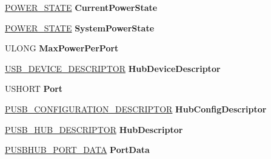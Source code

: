 \begin{DoxyCompactItemize}
\hyperlink{union___p_o_w_e_r___s_t_a_t_e}{P\+O\+W\+E\+R\+\_\+\+S\+T\+A\+TE} {\bfseries Current\+Power\+State}
\item 
\mbox{\label{struct___u_s_b_h_u_b___f_d_o___e_x_t_e_n_s_i_o_n_af9855319a7eea1134937a17fe565c3e7}} 
\hyperlink{union___p_o_w_e_r___s_t_a_t_e}{P\+O\+W\+E\+R\+\_\+\+S\+T\+A\+TE} {\bfseries System\+Power\+State}
\item 
\mbox{\label{struct___u_s_b_h_u_b___f_d_o___e_x_t_e_n_s_i_o_n_a7e05d4224e80a38971c818e67394a442}} 
U\+L\+O\+NG {\bfseries Max\+Power\+Per\+Port}
\item 
\mbox{\label{struct___u_s_b_h_u_b___f_d_o___e_x_t_e_n_s_i_o_n_a1c4201a4d51809ed5a7ebb88892f79ff}} 
\hyperlink{struct___u_s_b___d_e_v_i_c_e___d_e_s_c_r_i_p_t_o_r}{U\+S\+B\+\_\+\+D\+E\+V\+I\+C\+E\+\_\+\+D\+E\+S\+C\+R\+I\+P\+T\+OR} {\bfseries Hub\+Device\+Descriptor}
\item 
\mbox{\label{struct___u_s_b_h_u_b___f_d_o___e_x_t_e_n_s_i_o_n_af94ae362b26311f8301fe24cab26ed7d}} 
U\+S\+H\+O\+RT {\bfseries Port}
\item 
\mbox{\label{struct___u_s_b_h_u_b___f_d_o___e_x_t_e_n_s_i_o_n_a48a4ce8a606a859d1a9d5550b331c63b}} 
\hyperlink{struct___u_s_b___c_o_n_f_i_g_u_r_a_t_i_o_n___d_e_s_c_r_i_p_t_o_r}{P\+U\+S\+B\+\_\+\+C\+O\+N\+F\+I\+G\+U\+R\+A\+T\+I\+O\+N\+\_\+\+D\+E\+S\+C\+R\+I\+P\+T\+OR} {\bfseries Hub\+Config\+Descriptor}
\item 
\mbox{\label{struct___u_s_b_h_u_b___f_d_o___e_x_t_e_n_s_i_o_n_a9a6352c400aeb1710de6009b217ff207}} 
\hyperlink{struct___u_s_b___h_u_b___d_e_s_c_r_i_p_t_o_r}{P\+U\+S\+B\+\_\+\+H\+U\+B\+\_\+\+D\+E\+S\+C\+R\+I\+P\+T\+OR} {\bfseries Hub\+Descriptor}
\item 
\mbox{\label{struct___u_s_b_h_u_b___f_d_o___e_x_t_e_n_s_i_o_n_a0872dbbec0549664a8b489e9682ce07e}} 
\hyperlink{struct___u_s_b_h_u_b___p_o_r_t___d_a_t_a}{P\+U\+S\+B\+H\+U\+B\+\_\+\+P\+O\+R\+T\+\_\+\+D\+A\+TA} {\bfseries Port\+Data}

\end{DoxyCompactItemize}
